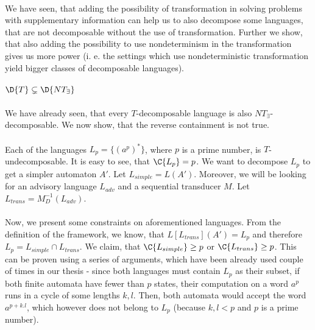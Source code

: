 \paragraph{}
We have seen, that adding the possibility of transformation in solving problems with supplementary information can help us to also decompose some languages, that are not decomposable without the use of transformation. Further we show, that also adding the possibility to use nondeterminism in the transformation gives us more power (i. e. the settings which use nondeterministic transformation yield bigger classes of decomposable languages).

\paragraph{}
\cveta $\D{T} \subsetneq \D{NT_{\exists}}$

\paragraph{}
\dokaz We have already seen, that every $T$-decomposable language is also $NT_{\exists}$-decomposable. We now show, that the reverse containment is not true.

\paragraph{}
Each of the languages $L_{p} = \{ (a^p)^*\}$, where  $p$ is a prime number, is $T$-undecomposable. It is easy to see, that $\C{L_p} = p$. We want to decompose $L_p$ to get a simpler automaton $A'$. Let $L_{simple} = L(A')$. Moreover, we will be looking for an advisory language $L_{adv}$ and a sequential transducer $M$. Let $L_{trans} = M_D^{-1}(L_{adv})$.

\paragraph{}
Now, we present some constraints on aforementioned languages. From the definition of the framework, we know, that $L[L_{trans}](A') = L_p$ and therefore $L_p = L_{simple} \cap L_{trans}$. We claim, that $\C{L_{simple}} \geq p$ or $\C{L_{trans}} \geq p$. This can be proven using a series of arguments, which have been already used couple of times in our thesis - since both languages must contain $L_p$ as their subset, if both finite automata have fewer than $p$ states, their computation on a word $a^p$ runs in a cycle of some lengths $k, l$. Then, both automata would accept the word $a^{p+k.l}$, which however does not belong to $L_p$ (because $k, l < p$ and $p$ is a prime number).

